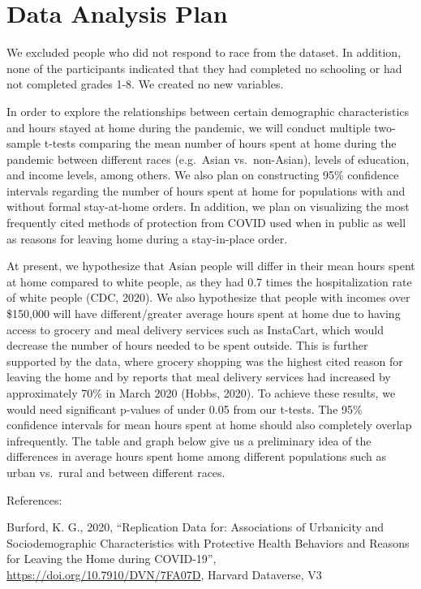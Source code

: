 \documentclass[
  11 pt,
]{article}
\begin{document}
\hypertarget{data-analysis-plan}{%
\section{Data Analysis Plan}\label{data-analysis-plan}}

We excluded people who did not respond to race from the dataset. In
addition, none of the participants indicated that they had completed no
schooling or had not completed grades 1-8. We created no new variables.

In order to explore the relationships between certain demographic
characteristics and hours stayed at home during the pandemic, we will
conduct multiple two-sample t-tests comparing the mean number of hours
spent at home during the pandemic between different races (e.g.~Asian
vs.~non-Asian), levels of education, and income levels, among others. We
also plan on constructing 95\% confidence intervals regarding the number
of hours spent at home for populations with and without formal
stay-at-home orders. In addition, we plan on visualizing the most
frequently cited methods of protection from COVID used when in public as
well as reasons for leaving home during a stay-in-place order.

At present, we hypothesize that Asian people will differ in their mean
hours spent at home compared to white people, as they had 0.7 times the
hospitalization rate of white people (CDC, 2020). We also hypothesize
that people with incomes over \$150,000 will have different/greater
average hours spent at home due to having access to grocery and meal
delivery services such as InstaCart, which would decrease the number of
hours needed to be spent outside. This is further supported by the data,
where grocery shopping was the highest cited reason for leaving the home
and by reports that meal delivery services had increased by
approximately 70\% in March 2020 (Hobbs, 2020). To achieve these
results, we would need significant p-values of under 0.05 from our
t-tests. The 95\% confidence intervals for mean hours spent at home
should also completely overlap infrequently. The table and graph below
give us a preliminary idea of the differences in average hours spent
home among different populations such as urban vs.~rural and between
different races.

References:

Burford, K. G., 2020, ``Replication Data for: Associations of Urbanicity
and Sociodemographic Characteristics with Protective Health Behaviors
and Reasons for Leaving the Home during COVID-19'',
\url{https://doi.org/10.7910/DVN/7FA07D}, Harvard Dataverse, V3
\end{document}
